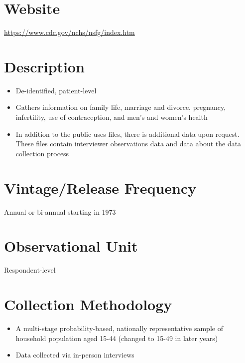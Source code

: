 \documentclass[
]{book}
\providecommand{\tightlist}{%
  \setlength{\itemsep}{0pt}\setlength{\parskip}{0pt}}
\begin{document}
\hypertarget{website-62}{%
\section{Website}\label{website-62}}

\url{https://www.cdc.gov/nchs/nsfg/index.htm}

\hypertarget{description-62}{%
\section{Description}\label{description-62}}

\begin{itemize}
\tightlist
\item
  De-identified, patient-level
\item
  Gathers information on family life, marriage and divorce, pregnancy, infertility, use of contraception, and men's and women's health
\item
  In addition to the public uses files, there is additional data upon request. These files contain interviewer observations data and data about the data collection process
\end{itemize}

\hypertarget{vintagerelease-frequency-62}{%
\section{Vintage/Release Frequency}\label{vintagerelease-frequency-62}}

Annual or bi-annual starting in 1973

\hypertarget{observational-unit-62}{%
\section{Observational Unit}\label{observational-unit-62}}

Respondent-level

\hypertarget{collection-methodology-62}{%
\section{Collection Methodology}\label{collection-methodology-62}}

\begin{itemize}
\tightlist
\item
  A multi-stage probability-based, nationally representative sample of household population aged 15-44 (changed to 15-49 in later years)
\item
  Data collected via in-person interviews
\end{itemize}
\end{document}
